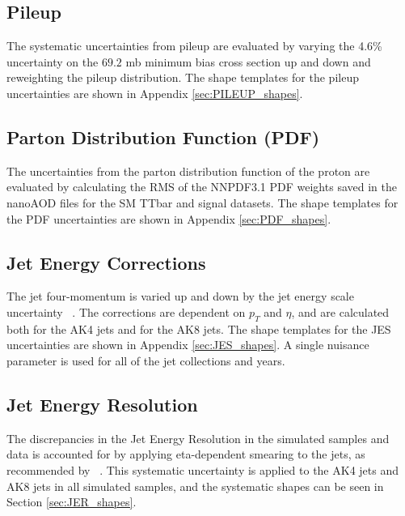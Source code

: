 \subsection{Pileup} \label{sectionPUunc}

The systematic uncertainties from pileup are evaluated by varying the 4.6\% uncertainty on the $69.2$ mb minimum bias cross section up and down and reweighting the pileup distribution. The shape templates for the pileup uncertainties are shown in Appendix \ref{sec:PILEUP_shapes}.

\subsection{Parton Distribution Function (PDF)} \label{sectionPDFunc}

The uncertainties from the parton distribution function of the proton are evaluated by calculating the RMS of the NNPDF3.1 PDF weights saved in the nanoAOD files for the SM TTbar and signal datasets. The shape templates for the PDF uncertainties are shown in Appendix \ref{sec:PDF_shapes}.


\subsection*{Jet Energy Corrections}

The jet four-momentum is varied up and down by the jet energy scale uncertainty ~\cite{CMS:JER}. The corrections are dependent on  $p_T$ and $\eta$, and are calculated both for the AK4 jets and for the AK8 jets. The shape templates for the JES uncertainties are shown in Appendix \ref{sec:JES_shapes}. A single nuisance parameter is used for all of the jet collections and years. 

\subsection*{Jet Energy Resolution}

The discrepancies in the Jet Energy Resolution in the simulated samples and data is accounted for by applying eta-dependent smearing to the jets, as recommended by ~\cite{CMS:JER}. This systematic uncertainty is applied to the AK4 jets and AK8 jets in all simulated samples, and the systematic shapes can be seen in Section \ref{sec:JER_shapes}. 






